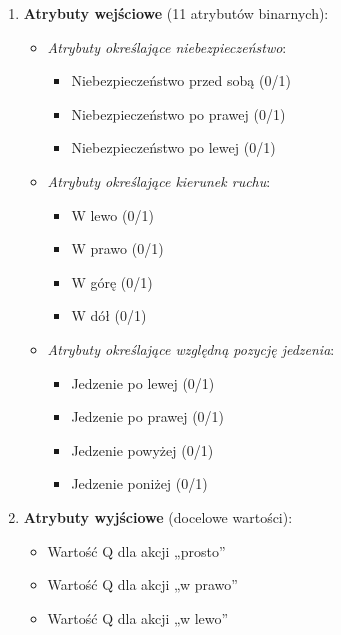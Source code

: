 \documentclass[a4paper,12pt]{article}
\begin{document}
\begin{enumerate}
  \item \textbf{Atrybuty wejściowe} (11 atrybutów binarnych):
    \begin{itemize}
      \item \emph{Atrybuty określające niebezpieczeństwo}:
        \begin{itemize}
          \item Niebezpieczeństwo przed sobą (0/1)
          \item Niebezpieczeństwo po prawej (0/1)
          \item Niebezpieczeństwo po lewej (0/1)
        \end{itemize}
      \item \emph{Atrybuty określające kierunek ruchu}:
        \begin{itemize}
          \item W lewo (0/1)
          \item W prawo (0/1)
          \item W górę (0/1)
          \item W dół (0/1)
        \end{itemize}
      \item \emph{Atrybuty określające względną pozycję jedzenia}:
        \begin{itemize}
          \item Jedzenie po lewej (0/1)
          \item Jedzenie po prawej (0/1)
          \item Jedzenie powyżej (0/1)
          \item Jedzenie poniżej (0/1)
        \end{itemize}
    \end{itemize}

  \item \textbf{Atrybuty wyjściowe} (docelowe wartości):
    \begin{itemize}
      \item Wartość Q dla akcji „prosto”
      \item Wartość Q dla akcji „w prawo”
      \item Wartość Q dla akcji „w lewo”
    \end{itemize}
\end{enumerate}
\end{document}
